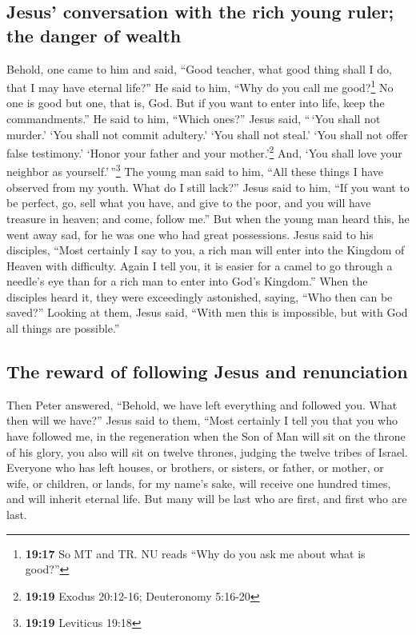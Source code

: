\hypertarget{jesus-conversation-with-the-rich-young-ruler-the-danger-of-wealth}{%
\subsection{Jesus' conversation with the rich young ruler; the danger of
wealth}\label{jesus-conversation-with-the-rich-young-ruler-the-danger-of-wealth}}

 Behold, one came to him and said, ``Good teacher, what
good thing shall I do, that I may have eternal life?'' 
He said to him, ``Why do you call me good?\footnote{\textbf{19:17} So MT
  and TR. NU reads ``Why do you ask me about what is good?''} No one is
good but one, that is, God. But if you want to enter into life, keep the
commandments.''  He said to him, ``Which ones?'' Jesus
said, ``\,`You shall not murder.' `You shall not commit adultery.' `You
shall not steal.' `You shall not offer false testimony.' 
`Honor your father and your mother.'\footnote{\textbf{19:19} Exodus
  20:12-16; Deuteronomy 5:16-20} And, `You shall love your neighbor as
yourself.'\,''\footnote{\textbf{19:19} Leviticus 19:18} 
The young man said to him, ``All these things I have observed from my
youth. What do I still lack?''  Jesus said to him, ``If
you want to be perfect, go, sell what you have, and give to the poor,
and you will have treasure in heaven; and come, follow me.''
 But when the young man heard this, he went away sad, for
he was one who had great possessions.  Jesus said to his
disciples, ``Most certainly I say to you, a rich man will enter into the
Kingdom of Heaven with difficulty.  Again I tell you, it
is easier for a camel to go through a needle's eye than for a rich man
to enter into God's Kingdom.''  When the disciples heard
it, they were exceedingly astonished, saying, ``Who then can be saved?''
 Looking at them, Jesus said, ``With men this is
impossible, but with God all things are possible.''

\hypertarget{the-reward-of-following-jesus-and-renunciation}{%
\subsection{The reward of following Jesus and
renunciation}\label{the-reward-of-following-jesus-and-renunciation}}

 Then Peter answered, ``Behold, we have left everything
and followed you. What then will we have?''  Jesus said
to them, ``Most certainly I tell you that you who have followed me, in
the regeneration when the Son of Man will sit on the throne of his
glory, you also will sit on twelve thrones, judging the twelve tribes of
Israel.  Everyone who has left houses, or brothers, or
sisters, or father, or mother, or wife, or children, or lands, for my
name's sake, will receive one hundred times, and will inherit eternal
life.  But many will be last who are first, and first who
are last.

